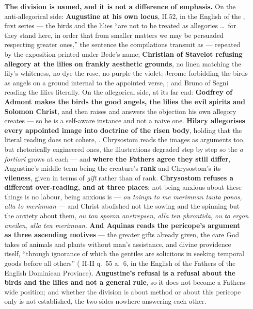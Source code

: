 \textbf{The division is named, and it is not a difference of emphasis.} On the
anti-allegorical side: \textbf{Augustine at his own locus},  II.52, in the English of the , first series --- the birds and the lilies ``are not to be treated as
allegories \dots\ for they stand here, in order that from smaller matters we may
be persuaded respecting greater ones,'' the sentence the compilations transmit
as  --- repeated by
the exposition printed under Bede's name; \textbf{Christian of Stavelot refusing allegory at
the lilies on frankly aesthetic grounds}, no linen matching the lily's
whiteness, no dye the rose, no purple the violet; Jerome forbidding the birds as
angels on a ground internal to the appointed verse, ; and Bruno of Segni reading the lilies literally. On the
allegorical side, at its far end: \textbf{Godfrey of Admont makes the birds the
good angels, the lilies the evil spirits and Solomon Christ}, and then raises
and answers the objection his own allegory creates --- so he is a self-aware
instance and not a naive one. \textbf{Hilary allegorises every appointed image
into doctrine of the risen body}, holding that the literal reading does not
cohere, . Chrysostom reads the images
as arguments too, but rhetorically engineered ones, the illustrations degraded
step by step so the \emph{a fortiori} grows at each --- and \textbf{where the
Fathers agree they still differ}, Augustine's middle term being the creature's
\textbf{rank} and Chrysostom's its \textbf{vileness}, given in terms of
\emph{gift} rather than of rank. \textbf{Chrysostom refuses a different
over-reading, and at three places}: not being anxious about these things is no
labour, being anxious is --- \emph{ou toinyn to me merimnan tauta ponos,
alla to merimnan} --- and Christ abolished not the sowing and the
spinning but the anxiety about them, \emph{ou ton sporon anetrepsen, alla ten
phrontida}, \emph{ou to ergon aneilen, alla ten merimnan}. \textbf{And Aquinas
reads the pericope's argument as three ascending motives} --- the greater gifts
already given, the care God takes of animals and plants without man's
assistance, and divine providence itself, ``through ignorance of which the
gentiles are solicitous in seeking temporal goods before all others''
( II-II q.~55 a.~6, in the English of the Fathers of the
English Dominican Province). \textbf{Augustine's refusal is a
refusal about the birds and the lilies and not a general rule}, so it does not
become a Fathers-wide position; and whether the division is about method or
about this pericope only is not established, the two sides nowhere answering
each other.

